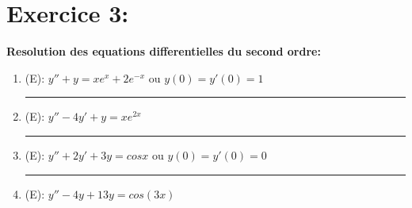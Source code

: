 \documentclass[a4paper,12pt]{article}
\begin{document}

\section*{Exercice 3:}
\textbf{Resolution des equations differentielles du second ordre:}

\begin{enumerate}
	\vspace{1cm}
	\item (E): $y'' + y = xe^x + 2e^{-x}$ ou $y(0) = y'(0) = 1$ \\
	
	
	\vspace{1cm}
	\hrule
	\vspace{1cm}
	
	\item (E): $y'' - 4y' + y = xe^{2x}$ \\
	
	
	\vspace{1cm}
	\hrule
	\vspace{1cm}
	
	\item (E): $y'' + 2y' +3y = cosx$ ou $y(0) = y'(0) = 0$\\
	
	
	\vspace{1cm}
	\hrule
	\vspace{1cm}
	
	\item (E): $y'' - 4y + 13y = cos(3x)$
	 \\
	
	\vspace{1cm}
\end{enumerate}
\end{document}
